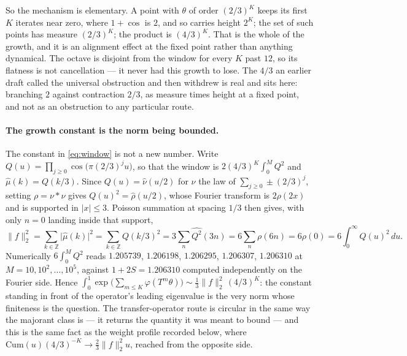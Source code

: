 \documentclass[11pt]{article}
\theoremstyle{remark}
\begin{document}
So the mechanism is elementary. A point with $\theta$ of order $(2/3)^K$ keeps its first $K$ iterates near
zero, where $1+\cos$ is $2$, and so carries height $2^K$; the set of such points has measure $(2/3)^K$;
the product is $(4/3)^K$. That is the whole of the growth, and it is an alignment effect at the fixed
point rather than anything dynamical. The octave is disjoint from the window for every $K$ past $12$, so
its flatness is not cancellation --- it never had this growth to lose. The $4/3$ an earlier draft called
the universal obstruction and then withdrew is real and sits here: branching $2$ against contraction
$2/3$, as measure times height at a fixed point, and not as an obstruction to any particular route.

\paragraph{The growth constant is the norm being bounded.} The constant in \eqref{eq:window} is not a new
number. Write $Q(u)=\prod_{j\ge0}\cos\bigl(\pi(2/3)^ju\bigr)$, so that the window is $2(4/3)^K\int_0^MQ^2$
and $\hat\mu(k)=Q(k/3)$. Since $Q(u)=\hat\nu(u/2)$ for $\nu$ the law of $\sum_{j\ge0}\pm(2/3)^j$, setting
$\rho=\nu*\nu$ gives $Q(u)^2=\hat\rho(u/2)$, whose Fourier transform is $2\rho(2x)$ and is supported in
$|x|\le3$. Poisson summation at spacing $1/3$ then gives, with only $n=0$ landing inside that support,
\begin{equation}\label{eq:constant}
  \|f\|_2^2=\sum_{k\in\mathbb Z}\bigl|\hat\mu(k)\bigr|^2=\sum_{k\in\mathbb Z}Q(k/3)^2
  =3\sum_{n}\widehat{Q^2}(3n)=6\sum_n\rho(6n)=6\rho(0)=6\int_0^\infty Q(u)^2\,du .
\end{equation}
Numerically $6\int_0^MQ^2$ reads $1.205739$, $1.206198$, $1.206295$, $1.206307$, $1.206310$ at
$M=10,10^2,\dots,10^5$, against $1+2S=1.206310$ computed independently on the Fourier side. Hence
$\int_0^1\exp\bigl(\sum_{m\le K}\varphi(T^m\theta)\bigr)\sim\tfrac13\|f\|_2^2\,(4/3)^K$: the constant
standing in front of the operator's leading eigenvalue is the very norm whose finiteness is the question.
The transfer-operator route is circular in the same way the majorant class is --- it returns the quantity
it was meant to bound --- and this is the same fact as the weight profile recorded below, where
$\mathrm{Cum}(u)(4/3)^{-K}\to\frac23\|f\|_2^2u$, reached from the opposite side.
\end{document}
